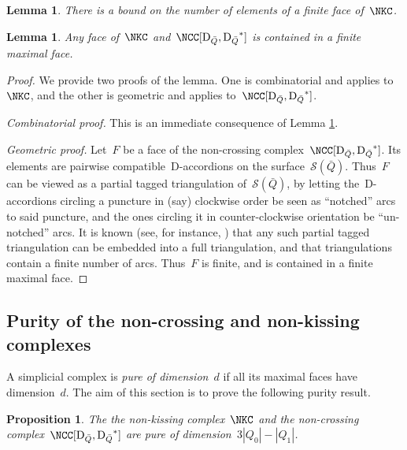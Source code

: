 \documentclass{amsart}
\newtheorem{proposition}[theorem]{Proposition}
\newtheorem{lemma}[theorem]{Lemma}
\theoremstyle{definition}
\newcommand{\darkblue}{\color{darkblue}} %
\newcommand{\defn}[1]{\textsl{\darkblue #1}} %
\newcommand{\surface}{\mathcal{S}} %
\newcommand{\dual}{^*} %
\newcommand{\dissection}{\mathrm{D}} %
\begin{document}
\begin{lemma}
\label{lemm:facesAreBounded}
There is a bound on the number of elements of a finite face of~$\NKC$.
\end{lemma}



\begin{lemma}
\label{lemm:facetsAreFinite}
Any face of~$\NKC$ and~$\NCC[\dissection_{\bar Q}, {\dissection_{\bar Q}}\dual]$ is contained in a finite maximal face.
\end{lemma}
\begin{proof}
 We provide two proofs of the lemma.  One is combinatorial and applies to~$\NKC$, and the other is geometric and applies to~$\NCC[\dissection_{\bar Q}, {\dissection_{\bar Q}}\dual]$.
 
 {\it Combinatorial proof.}
 This is an immediate consequence of Lemma \ref{lemm:facesAreBounded}.
 
 {\it Geometric proof.} Let~$F$ be a face of the non-crossing complex~$\NCC[\dissection_{\bar Q}, {\dissection_{\bar Q}}\dual]$.
 Its elements are pairwise compatible~$\dissection$-accordions on the surface~$\surface(\bar Q)$.
 Thus~$F$ can be viewed as a partial tagged triangulation of~$\surface(\bar Q)$, by letting the~$\dissection$-accordions circling a puncture in (say) clockwise order be seen as ``notched'' arcs to said puncture, and the ones circling it in counter-clockwise orientation be ``un-notched'' arcs.
 It is known (see, for instance, \cite{FominShapiroThurston}) that any such partial tagged triangulation can be embedded into a full triangulation, and that triangulations contain a finite number of arcs.
 Thus~$F$ is finite, and is contained in a finite maximal face.
\end{proof}



\subsection{Purity of the non-crossing and non-kissing complexes}

A simplicial complex is \defn{pure of dimension~$d$} if all its maximal faces have dimension~$d$.
The aim of this section is to prove the following purity result.

\begin{proposition}
\label{prop:purity}
 The the non-kissing complex~$\NKC$ and the non-crossing complex~$\NCC[\dissection_{\bar Q}, {\dissection_{\bar Q}}\dual]$ are pure of dimension~$3|Q_0| - |Q_1|$.
\end{proposition}
\end{document}
